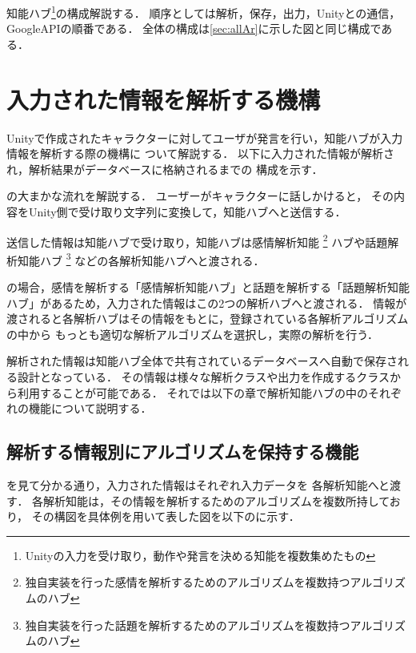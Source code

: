 知能ハブ\footnote{Unityの入力を受け取り，動作や発言を決める知能を複数集めたもの}の構成解説する．
順序としては解析，保存，出力，Unityとの通信，GoogleAPIの順番である．
全体の構成は\ref{sec:allAr}に示した図と同じ構成である．

\section{入力された情報を解析する機構}
Unityで作成されたキャラクターに対してユーザが発言を行い，知能ハブが入力情報を解析する際の機構に
ついて解説する．
以下に入力された情報が解析され，解析結果がデータベースに格納されるまでの
構成を示す．


の大まかな流れを解説する．
ユーザーがキャラクターに話しかけると，
その内容をUnity側で受け取り文字列に変換して，知能ハブへと送信する．

送信した情報は知能ハブで受け取り，知能ハブは感情解析知能
\footnote{独自実装を行った感情を解析するためのアルゴリズムを複数持つアルゴリズムのハブ}
ハブや話題解析知能ハブ
\footnote{独自実装を行った話題を解析するためのアルゴリズムを複数持つアルゴリズムのハブ}
などの各解析知能ハブへと渡される．

の場合，感情を解析する「感情解析知能ハブ」と話題を解析する「話題解析知能
ハブ」があるため，入力された情報はこの2つの解析ハブへと渡される．
情報が渡されると各解析ハブはその情報をもとに，登録されている各解析アルゴリズムの中から
もっとも適切な解析アルゴリズムを選択し，実際の解析を行う．

解析された情報は知能ハブ全体で共有されているデータベースへ自動で保存される設計となっている．
その情報は様々な解析クラスや出力を作成するクラスから利用することが可能である．
それでは以下の章で解析知能ハブの中のそれぞれの機能について説明する．

\subsection{解析する情報別にアルゴリズムを保持する機能}
を見て分かる通り，入力された情報はそれぞれ入力データを
各解析知能へと渡す．
各解析知能は，その情報を解析するためのアルゴリズムを複数所持しており，
その構図を具体例を用いて表した図を以下のに示す．

